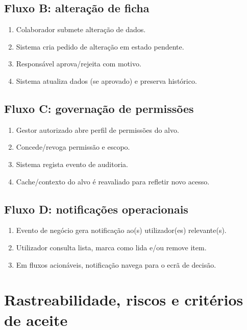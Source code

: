 \documentclass[11pt,a4paper,twoside]{article}
\begin{document}
\subsection{Fluxo B: alteração de ficha}
\begin{enumerate}
  \item Colaborador submete alteração de dados.
  \item Sistema cria pedido de alteração em estado pendente.
  \item Responsável aprova/rejeita com motivo.
  \item Sistema atualiza dados (se aprovado) e preserva histórico.
\end{enumerate}

\subsection{Fluxo C: governação de permissões}
\begin{enumerate}
  \item Gestor autorizado abre perfil de permissões do alvo.
  \item Concede/revoga permissão e escopo.
  \item Sistema regista evento de auditoria.
  \item Cache/contexto do alvo é reavaliado para refletir novo acesso.
\end{enumerate}

\subsection{Fluxo D: notificações operacionais}
\begin{enumerate}
  \item Evento de negócio gera notificação ao(s) utilizador(es) relevante(s).
  \item Utilizador consulta lista, marca como lida e/ou remove item.
  \item Em fluxos acionáveis, notificação navega para o ecrã de decisão.
\end{enumerate}

\section{Rastreabilidade, riscos e critérios de aceite}
\end{document}
